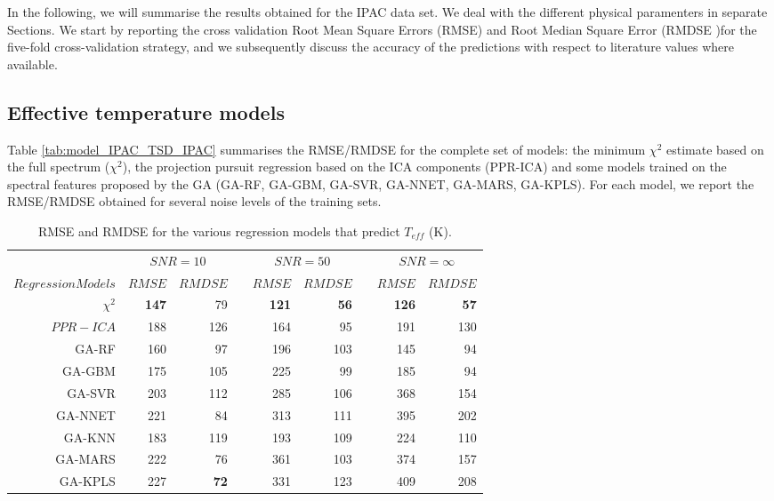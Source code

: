 
In the following, we will summarise the results obtained for the IPAC
data set. We deal with the different physical paramenters in separate
Sections. We start by reporting the cross validation Root Mean Square
Errors (RMSE) and Root Median Square Error (RMDSE )for the five-fold
cross-validation strategy, and we subsequently discuss the accuracy of
the predictions with respect to literature values where available.

\subsection{Effective temperature models}

Table \ref{tab:model_IPAC_TSD_IPAC} summarises the RMSE/RMDSE for the
complete set of models: the minimum $\chi^2$ estimate based on the
full spectrum ($\chi^2$), the projection pursuit regression based on
the ICA components (PPR-ICA) and some models trained on the spectral
features proposed by the GA (GA-RF, GA-GBM, GA-SVR, GA-NNET, GA-MARS,
GA-KPLS). For each model, we report the RMSE/RMDSE obtained for
several noise levels of the training sets.

\begin{table}\centering
{}
\begin{tabular}{@{}rrrcrrcrr@{}}\toprule
& \multicolumn{2}{c}{$SNR = 10$} & \phantom{ab}& \multicolumn{2}{c}{$SNR = 50$} &
\phantom{ab} & \multicolumn{2}{c}{$SNR = \infty$}\\
\cmidrule{2-3} \cmidrule{5-6} \cmidrule{8-9}
$Regression Models$ & $RMSE$ & $RMDSE$ && $RMSE$ & $RMDSE$ && $RMSE$ & $RMDSE$ \\ \midrule
$\chi^2$    & {\bf 147} & 79       && {\bf 121} & {\bf 56}  && {\bf 126} & {\bf 57} \\
$ PPR-ICA$  & 188       & 126      && 164       & 95        && 191       & 130 \\
GA-RF       & 160       & 97       && 196       & 103       && 145       & 94 \\
GA-GBM      & 175       & 105      && 225       & 99        && 185       & 94 \\
GA-SVR      & 203       & 112      && 285       & 106       && 368       & 154 \\
GA-NNET     & 221       & 84       && 313       & 111       && 395       & 202 \\
GA-KNN      & 183       & 119      && 193       & 109       && 224       & 110  \\
GA-MARS     & 222       & 76       && 361       & 103       && 374       & 157 \\
GA-KPLS     & 227       & {\bf 72} && 331       & 123       && 409       & 208 \\
\bottomrule
\end{tabular}
\caption {RMSE and RMDSE for the various regression models that predict $T_{eff}$ (K).} 
\label{tab:model_TSD_IPAC} 
\end{table}

